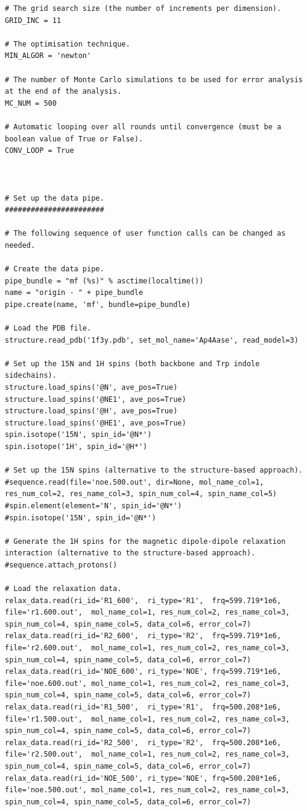 \begin{htmlonly}
\begin{htmlonly}
\begin{lstlisting}
# The grid search size (the number of increments per dimension).
GRID_INC = 11

# The optimisation technique.
MIN_ALGOR = 'newton'

# The number of Monte Carlo simulations to be used for error analysis at the end of the analysis.
MC_NUM = 500

# Automatic looping over all rounds until convergence (must be a boolean value of True or False).
CONV_LOOP = True



# Set up the data pipe.
#######################

# The following sequence of user function calls can be changed as needed.

# Create the data pipe.
pipe_bundle = "mf (%s)" % asctime(localtime())
name = "origin - " + pipe_bundle
pipe.create(name, 'mf', bundle=pipe_bundle)

# Load the PDB file.
structure.read_pdb('1f3y.pdb', set_mol_name='Ap4Aase', read_model=3)

# Set up the 15N and 1H spins (both backbone and Trp indole sidechains).
structure.load_spins('@N', ave_pos=True)
structure.load_spins('@NE1', ave_pos=True)
structure.load_spins('@H', ave_pos=True)
structure.load_spins('@HE1', ave_pos=True)
spin.isotope('15N', spin_id='@N*')
spin.isotope('1H', spin_id='@H*')

# Set up the 15N spins (alternative to the structure-based approach).
#sequence.read(file='noe.500.out', dir=None, mol_name_col=1, res_num_col=2, res_name_col=3, spin_num_col=4, spin_name_col=5)
#spin.element(element='N', spin_id='@N*')
#spin.isotope('15N', spin_id='@N*')

# Generate the 1H spins for the magnetic dipole-dipole relaxation interaction (alternative to the structure-based approach).
#sequence.attach_protons()

# Load the relaxation data.
relax_data.read(ri_id='R1_600',  ri_type='R1',  frq=599.719*1e6, file='r1.600.out',  mol_name_col=1, res_num_col=2, res_name_col=3, spin_num_col=4, spin_name_col=5, data_col=6, error_col=7)
relax_data.read(ri_id='R2_600',  ri_type='R2',  frq=599.719*1e6, file='r2.600.out',  mol_name_col=1, res_num_col=2, res_name_col=3, spin_num_col=4, spin_name_col=5, data_col=6, error_col=7)
relax_data.read(ri_id='NOE_600', ri_type='NOE', frq=599.719*1e6, file='noe.600.out', mol_name_col=1, res_num_col=2, res_name_col=3, spin_num_col=4, spin_name_col=5, data_col=6, error_col=7)
relax_data.read(ri_id='R1_500',  ri_type='R1',  frq=500.208*1e6, file='r1.500.out',  mol_name_col=1, res_num_col=2, res_name_col=3, spin_num_col=4, spin_name_col=5, data_col=6, error_col=7)
relax_data.read(ri_id='R2_500',  ri_type='R2',  frq=500.208*1e6, file='r2.500.out',  mol_name_col=1, res_num_col=2, res_name_col=3, spin_num_col=4, spin_name_col=5, data_col=6, error_col=7)
relax_data.read(ri_id='NOE_500', ri_type='NOE', frq=500.208*1e6, file='noe.500.out', mol_name_col=1, res_num_col=2, res_name_col=3, spin_num_col=4, spin_name_col=5, data_col=6, error_col=7)


\end{lstlisting}
\end{htmlonly}
\end{htmlonly}
